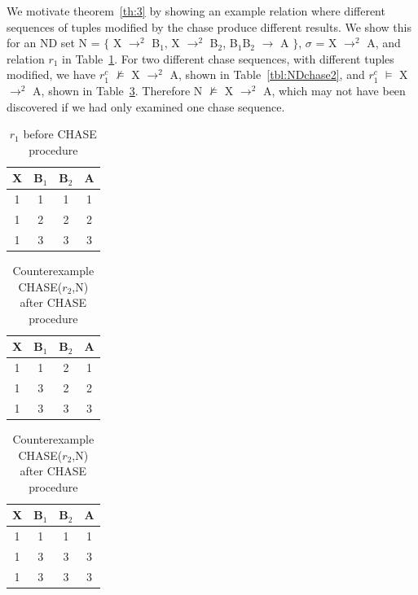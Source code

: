 We motivate theorem~\ref{th:3} by showing an example relation where
different sequences of tuples modified by the chase produce different
results. We show this for an ND set \linebreak N = $\{$ X $\to^2$ 
B$_1$,  X $\to^2$ B$_2$, B$_1$B$_2$ $\to$ A $\}$, $\sigma$ = X $\to^2$
A, and relation $r_1$ in
Table~\ref{tbl:NDchase1}. 
 For two different chase sequences, with different tuples modified, we have
$r_{1}^c$ 
$\not\models$ X $\to^2$ A, shown in Table~\ref{tbl:NDchase2}, and $r_{1}^c$ 
$\models$ X $\to^2$ A, shown in Table~\ref{tbl:NDchase4}.
Therefore 
N $\not\models$  X $\to^2$ A, which may not have been discovered if
we had only examined one chase sequence.

{\line
\begin{table}[ht]
\begin{center}
\begin{tabular}{|c|c|c|c|} \hline
 {\bf X} & {\bf B$_1$} & {\bf B$_2$} & {\bf A} \\\hline
 1 & 1 & 1 & 1 \\ 
 1 & 2 & 2 & 2 \\ 
 1 & 3 & 3 & 3 \\ \hline
\end{tabular}
\end{center}
\caption{\label{tbl:NDchase1}$r_1$ before CHASE procedure} 
\end{table}
}

{\line
\begin{table}[ht]
\begin{minipage}[b]{7cm}
\begin{center}
\begin{tabular}{|c|c|c|c|} \hline
 {\bf X} & {\bf B$_1$} & {\bf B$_2$} & {\bf A} \\\hline
 1 & 1 & 2 & 1 \\ 
 1 & 3 & 2 & 2 \\ 
 1 & 3 & 3 & 3 \\ \hline
\end{tabular}
\end{center}
\caption{\label{tbl:NDchase2}Example CHASE($r_1$,N) after CHASE procedure} 
\end{minipage}
\hfill
\begin{minipage}[b]{7cm}
\begin{center}
\begin{tabular}{|c|c|c|c|} \hline
 {\bf X} & {\bf B$_1$} & {\bf B$_2$} & {\bf A} \\\hline
 1 & 1 & 1 & 1 \\ 
 1 & 3 & 3 & 3 \\ 
 1 & 3 & 3 & 3 \\ \hline
\end{tabular}
\end{center}
\caption{\label{tbl:NDchase4}Counterexample CHASE($r_2$,N) after CHASE procedure } 
\end{minipage}
\end{table}
}


